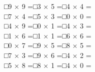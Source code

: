 \documentclass[uplatex,
paper=a4,
fontsize=18pt,
jafontsize=16pt,
number_of_lines=30,
line_length=30zh,
baselineskip=25pt,
]{jlreq}
\begin{document}
□\hspace{1em}9 × 9 =\hspace{3em}□\hspace{1em}3 × 5 =\hspace{3em}□\hspace{1em}4 × 4 =\hspace{3em}
\\

□\hspace{1em}7 × 4 =\hspace{3em}□\hspace{1em}5 × 3 =\hspace{3em}□\hspace{1em}0 × 0 =\hspace{3em}
\\

□\hspace{1em}4 × 9 =\hspace{3em}□\hspace{1em}0 × 1 =\hspace{3em}□\hspace{1em}4 × 3 =\hspace{3em}
\\

□\hspace{1em}1 × 6 =\hspace{3em}□\hspace{1em}1 × 1 =\hspace{3em}□\hspace{1em}6 × 6 =\hspace{3em}
\\

□\hspace{1em}0 × 7 =\hspace{3em}□\hspace{1em}9 × 5 =\hspace{3em}□\hspace{1em}8 × 5 =\hspace{3em}
\\

□\hspace{1em}7 × 3 =\hspace{3em}□\hspace{1em}9 × 6 =\hspace{3em}□\hspace{1em}4 × 2 =\hspace{3em}
\\

□\hspace{1em}5 × 8 =\hspace{3em}□\hspace{1em}8 × 1 =\hspace{3em}□\hspace{1em}4 × 0 =\hspace{3em}
\\
\end{document}
